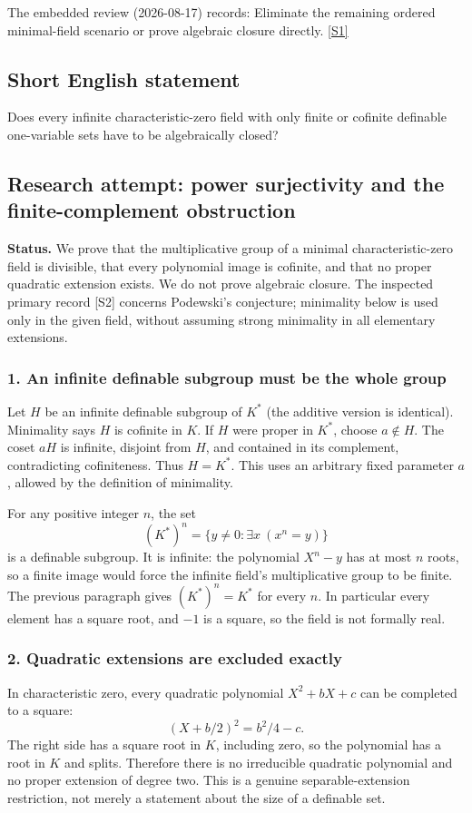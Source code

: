 \documentclass[11pt,a4paper]{article}
\newcommand{\sref}[2]{\hyperlink{source:#1:#2}{[S#2]}}
\begin{document}
The embedded review (2026-08-17) records: Eliminate the remaining ordered minimal-field scenario or prove algebraic closure directly. \sref{statement}{1}

\subsection{Short English statement}

Does every infinite characteristic-zero field with only finite or cofinite definable one-variable sets have to be algebraically closed?

\subsection{Research attempt: power surjectivity and the finite-complement obstruction}
\textbf{Status.} We prove that the multiplicative group of a minimal characteristic-zero field is divisible, that every polynomial image is cofinite, and that no proper quadratic extension exists. We do not prove algebraic closure. The inspected primary record [S2] concerns Podewski's conjecture; minimality below is used only in the given field, without assuming strong minimality in all elementary extensions.

\subsubsection{1. An infinite definable subgroup must be the whole group}
Let $H$ be an infinite definable subgroup of $K^*$ (the additive version is identical). Minimality says $H$ is cofinite in $K$. If $H$ were proper in $K^*$, choose $a\notin H$. The coset $aH$ is infinite, disjoint from $H$, and contained in its complement, contradicting cofiniteness. Thus $H=K^*$. This uses an arbitrary fixed parameter $a$, allowed by the definition of minimality.

For any positive integer $n$, the set
\[(K^*)^n=\{y\ne0:\exists x\ (x^n=y)\}
\]
is a definable subgroup. It is infinite: the polynomial $X^n-y$ has at most $n$ roots, so a finite image would force the infinite field's multiplicative group to be finite. The previous paragraph gives $(K^*)^n=K^*$ for every $n$. In particular every element has a square root, and $-1$ is a square, so the field is not formally real.

\subsubsection{2. Quadratic extensions are excluded exactly}
In characteristic zero, every quadratic polynomial $X^2+bX+c$ can be completed to a square:
\[(X+b/2)^2=b^2/4-c.
\]
The right side has a square root in $K$, including zero, so the polynomial has a root in $K$ and splits. Therefore there is no irreducible quadratic polynomial and no proper extension of degree two. This is a genuine separable-extension restriction, not merely a statement about the size of a definable set.
\end{document}
